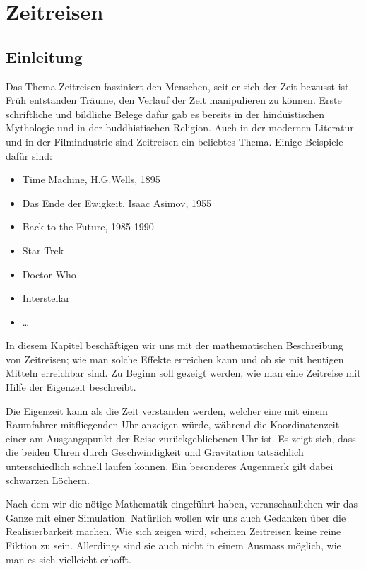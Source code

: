 \chapter{Zeitreisen\label{chapter:thema}}
\begin{refsection}
\section{Einleitung}

	Das Thema Zeitreisen fasziniert den Menschen, seit er sich der Zeit bewusst ist. Früh entstanden Träume, den Verlauf der Zeit manipulieren zu können. Erste schriftliche und bildliche Belege dafür gab es bereits in der hinduistischen Mythologie und in der buddhistischen Religion. Auch in der modernen Literatur und in der Filmindustrie sind Zeitreisen ein beliebtes Thema. Einige Beispiele daf\"ur sind: 
\begin{itemize}
    \item Time Machine, H.G.Wells, 1895 
    \item Das Ende der Ewigkeit, Isaac Asimov, 1955
    \item Back to the Future, 1985-1990
    \item Star Trek
    \item Doctor Who
    \item Interstellar
    \item \dots

\end{itemize}
In diesem Kapitel beschäftigen wir uns mit der mathematischen Beschreibung von Zeitreisen; wie man solche Effekte erreichen kann und ob sie mit heutigen Mitteln erreichbar sind. Zu Beginn soll gezeigt werden, wie man eine Zeitreise mit Hilfe der Eigenzeit beschreibt.

Die Eigenzeit kann als die Zeit verstanden werden, welcher eine mit einem Raumfahrer mitfliegenden Uhr anzeigen würde, während die Koordinatenzeit einer am Ausgangspunkt der Reise zurückgebliebenen Uhr ist.
Es zeigt sich, dass die beiden Uhren durch Geschwindigkeit und Gravitation tatsächlich unterschiedlich schnell laufen können. Ein besonderes Augenmerk gilt dabei schwarzen Löchern. 

Nach dem wir die nötige Mathematik eingeführt haben, veranschaulichen wir das Ganze mit einer Simulation. Natürlich wollen wir uns auch Gedanken über die Realisierbarkeit machen. Wie sich zeigen wird, scheinen Zeitreisen keine reine Fiktion zu sein. Allerdings sind sie auch nicht in einem Ausmass möglich, wie man es sich vielleicht erhofft.


\end{refsection}

